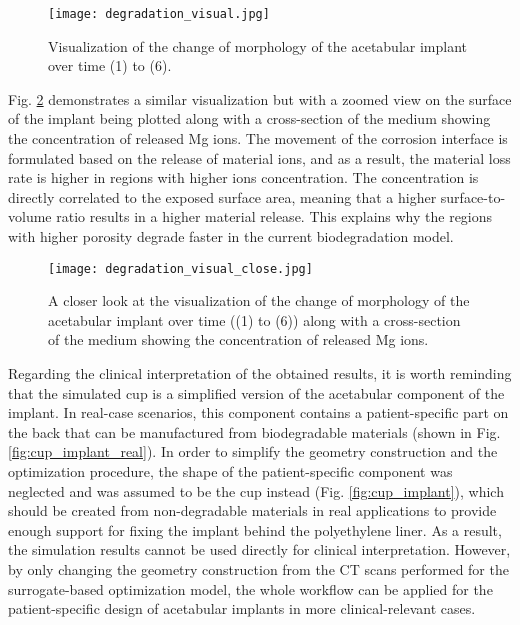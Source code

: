 \begin{figure}[h]
\centering
\medskip
\texttt{[image: degradation\_visual.jpg]}
\caption[Visualization of the change of morphology of the acetabular implant]{Visualization of the change of morphology of the acetabular implant over time (1) to (6).} \label{fig:cup_degradation_visual}
\end{figure}

Fig. \ref{fig:cup_degradation_visual_close} demonstrates a similar visualization but with a zoomed view on the surface of the implant being plotted along with a cross-section of the medium showing the concentration of released Mg ions. The movement of the corrosion interface is formulated based on the release of material ions, and as a result, the material loss rate is higher in regions with higher ions concentration. The concentration is directly correlated to the exposed surface area, meaning that a higher surface-to-volume ratio results in a higher material release. This explains why the regions with higher porosity degrade faster in the current biodegradation model.%

\begin{figure}[h]
\centering
\medskip
\texttt{[image: degradation\_visual\_close.jpg]}
\caption[Visualization of the change of morphology of the acetabular implant]{A closer look at the visualization of the change of morphology of the acetabular implant over time ((1) to (6)) along with a cross-section of the medium showing the concentration of released Mg ions.} \label{fig:cup_degradation_visual_close}
\end{figure}

Regarding the clinical interpretation of the obtained results, it is worth reminding that the simulated cup is a simplified version of the acetabular component of the implant. In real-case scenarios, this component contains a patient-specific part on the back that can be manufactured from biodegradable materials (shown in Fig. \ref{fig:cup_implant_real}). In order to simplify the geometry construction and the optimization procedure, the shape of the patient-specific component was neglected and was assumed to be the cup instead (Fig. \ref{fig:cup_implant}), which should be created from non-degradable materials in real applications to provide enough support for fixing the implant behind the polyethylene liner. As a result, the simulation results cannot be used directly for clinical interpretation. However, by only changing the geometry construction from the CT scans performed for the surrogate-based optimization model, the whole workflow can be applied for the patient-specific design of acetabular implants in more clinical-relevant cases. 

